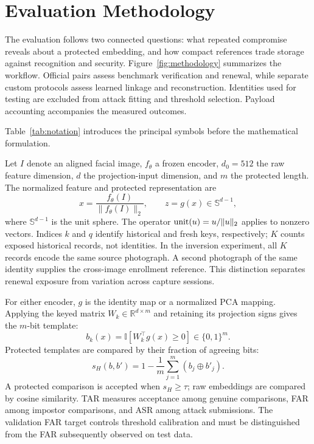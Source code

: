 \section{Evaluation Methodology}\label{sec:methodology}
The evaluation follows two connected questions: what repeated compromise reveals about a protected embedding, and how compact references trade storage against recognition and security. Figure~\ref{fig:methodology} summarizes the workflow. Official pairs assess benchmark verification and renewal, while separate custom protocols assess learned linkage and reconstruction. Identities used for testing are excluded from attack fitting and threshold selection. Payload accounting accompanies the measured outcomes.

Table~\ref{tab:notation} introduces the principal symbols before the mathematical formulation.



Let $I$ denote an aligned facial image, $f_\theta$ a frozen encoder, $d_0=512$ the raw feature dimension, $d$ the projection-input dimension, and $m$ the protected length. The normalized feature and protected representation are
\begin{equation}
 x=\frac{f_\theta(I)}{\|f_\theta(I)\|_2},\qquad z=g(x)\in\mathbb S^{d-1},
\end{equation}
where $\mathbb S^{d-1}$ is the unit sphere. The operator $\operatorname{unit}(u)=u/\|u\|_2$ applies to nonzero vectors. Indices $k$ and $q$ identify historical and fresh keys, respectively; $K$ counts exposed historical records, not identities. In the inversion experiment, all $K$ records encode the same source photograph. A second photograph of the same identity supplies the cross-image enrollment reference. This distinction separates renewal exposure from variation across capture sessions.



For either encoder, $g$ is the identity map or a normalized PCA mapping. Applying the keyed matrix $W_k\in\mathbb{R}^{d\times m}$ and retaining its projection signs gives the $m$-bit template:
\begin{equation}
 b_k(x)=\mathbb{I}[W_k^\top g(x)\geq0]\in\{0,1\}^{m}.
\end{equation}
Protected templates are compared by their fraction of agreeing bits:
\begin{equation}
 s_H(b,b')=1-\frac{1}{m}\sum_{j=1}^{m}(b_j\oplus b'_j).
\end{equation}
A protected comparison is accepted when $s_H\geq\tau$; raw embeddings are compared by cosine similarity. TAR measures acceptance among genuine comparisons, FAR among impostor comparisons, and ASR among attack submissions. The validation FAR target controls threshold calibration and must be distinguished from the FAR subsequently observed on test data.


